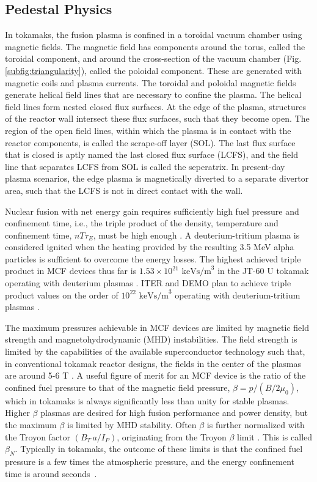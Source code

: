 \documentclass[a4paper, twoside, final, 12pt]{article}
\begin{document}
\subsection{Pedestal Physics}\label{subsec:purpose}
In tokamaks, the fusion plasma is confined in a toroidal vacuum chamber using magnetic fields.
The magnetic field has components around the torus, called the toroidal component, and around the cross-section of the vacuum chamber (Fig. \ref{subfig:triangularity}), called the poloidal component.
These are generated with magnetic coils and plasma currents.
The toroidal and poloidal magnetic fields generate helical field lines that are necessary to confine the plasma.
The helical field lines form nested closed flux surfaces.
At the edge of the plasma, structures of the reactor wall intersect these flux surfaces, such that they become open.
The region of the open field lines, within which the plasma is in contact with the reactor components, is called the scrape-off layer (SOL).
The last flux surface that is closed is aptly named the last closed flux surface (LCFS), and the field line that separates LCFS from SOL is called the seperatrix.
In present-day plasma scenarios, the edge plasma is magnetically diverted to a separate divertor area, such that the LCFS is not in direct contact with the wall.

Nuclear fusion with net energy gain requires sufficiently high fuel pressure and confinement time, i.e., the triple product of the density, temperature and confinement time, $nT\tau_E$,  must be high enough \cite{Lawson_1957}. A deuterium-tritium plasma is considered ignited when the heating provided by the resulting 3.5 MeV alpha particles is sufficient to overcome the energy losses. 
The highest achieved triple product in MCF devices thus far is $1.53\times 10^{21}\text{ keVs/m}^3$ in the JT-60 U tokamak operating with deuterium plasmas \cite{JT60_triple}. ITER and DEMO plan to achieve triple product values on the order of $10^{22}\text{ keVs/m}^3$ operating with deuterium-tritium plasmas \cite{EUROfusionroadmap}.

The maximum pressures achievable in MCF devices are limited by magnetic field strength and magnetohydrodynamic (MHD) instabilities.
The field strength is limited by the capabilities of the available superconductor technology such that, in conventional tokamak reactor designs, the fields in the center of the plasmas are around 5-6 T \cite{zohm_use_2019}. A useful figure of merit for an MCF device is the ratio of the confined fuel pressure to that of the magnetic field pressure, $\beta = p / (B/2\mu_0)$, which in tokamaks is always significantly less than unity for stable plasmas. Higher $\beta$ plasmas are desired for high fusion performance and power density, but the maximum $\beta$ is limited by MHD stability. Often $\beta$ is further normalized with the Troyon factor $(B_T \, a/ I_P)$, originating from the Troyon $\beta$ limit \cite{Troyon_1988}. This is called $\beta_N$. Typically in tokamaks, the outcome of these limits is that the confined fuel pressure is a few times the atmospheric pressure, and the energy confinement time is around seconds~\cite{FEDERICI2014882}.
\end{document}
